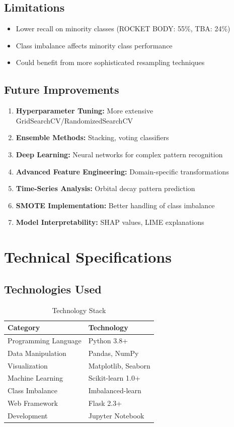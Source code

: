 \documentclass[12pt,a4paper]{article}
\begin{document}
\subsection{Limitations}
\begin{itemize}
    \item Lower recall on minority classes (ROCKET BODY: 55\%, TBA: 24\%)
    \item Class imbalance affects minority class performance
    \item Could benefit from more sophisticated resampling techniques
\end{itemize}

\subsection{Future Improvements}
\begin{enumerate}
    \item \textbf{Hyperparameter Tuning:} More extensive GridSearchCV/RandomizedSearchCV
    \item \textbf{Ensemble Methods:} Stacking, voting classifiers
    \item \textbf{Deep Learning:} Neural networks for complex pattern recognition
    \item \textbf{Advanced Feature Engineering:} Domain-specific transformations
    \item \textbf{Time-Series Analysis:} Orbital decay pattern prediction
    \item \textbf{SMOTE Implementation:} Better handling of class imbalance
    \item \textbf{Model Interpretability:} SHAP values, LIME explanations
\end{enumerate}

\section{Technical Specifications}

\subsection{Technologies Used}
\begin{table}[H]
\centering
\begin{tabular}{@{}ll@{}}
\toprule
\textbf{Category} & \textbf{Technology} \\
\midrule
Programming Language & Python 3.8+ \\
Data Manipulation & Pandas, NumPy \\
Visualization & Matplotlib, Seaborn \\
Machine Learning & Scikit-learn 1.0+ \\
Class Imbalance & Imbalanced-learn \\
Web Framework & Flask 2.3+ \\
Development & Jupyter Notebook \\
\bottomrule
\end{tabular}
\caption{Technology Stack}
\label{tab:tech_stack}
\end{table}
\end{document}

